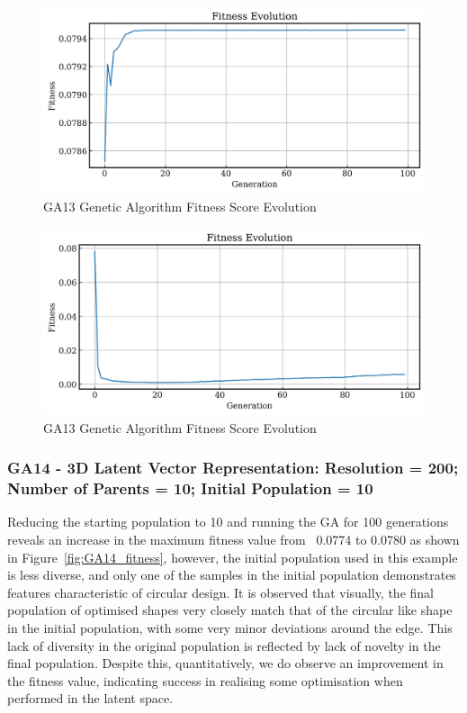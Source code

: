 \documentclass{article}
\begin{document}
\begin{figure}[H]
    \centering
    \includegraphics[width=0.75\linewidth]{figures/GAResults/GA13/latent/100gen_fitness.png}
    \caption{GA13 Genetic Algorithm Fitness Score Evolution}
    \label{fig:GA13_latent_fitness}
\end{figure}
\begin{figure}[H]
    \centering
    \includegraphics[width=0.75\linewidth]{figures/GAResults/GA13/original/original_fitness_plot.png}
    \caption{GA13 Genetic Algorithm Fitness Score Evolution}
    \label{fig:GA13_original_fitness}
\end{figure}

\subsubsection*{GA14 - 3D Latent Vector Representation: Resolution = 200; Number of Parents = 10; Initial Population = 10}
Reducing the starting population to 10 and running the GA for 100 generations reveals an increase in the maximum fitness value from ~0.0774 to 0.0780 as shown in Figure~\ref{fig:GA14_fitness}, however, the initial population used in this example is less diverse, and only one of the samples in the initial population demonstrates features characteristic of circular design. It is observed that visually, the final population of optimised shapes very closely match that of the circular like shape in the initial population, with some very minor deviations around the edge. This lack of diversity in the original population is reflected by lack of novelty in the final population. Despite this, quantitatively, we do observe an improvement in the fitness value, indicating success in realising some optimisation when performed in the latent space.
\end{document}
